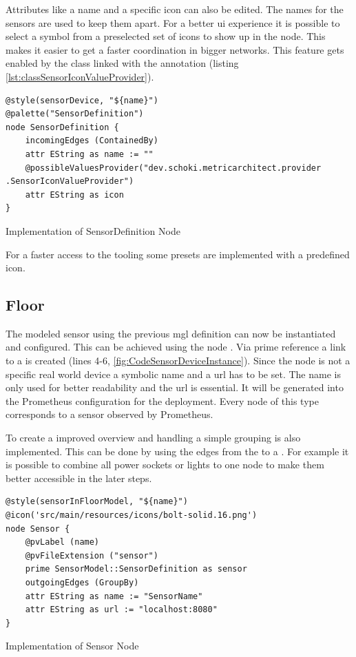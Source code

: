 Attributes like a name and a specific icon  can also be edited. The names for the sensors are used to keep them apart. For a better \gls{ui} experience it is possible to select a symbol from a preselected set of icons to show up in the node. This makes it easier to get a faster coordination in bigger networks. This feature gets enabled by the  class linked with the  annotation (listing \ref{lst:classSensorIconValueProvider}).
\begin{listing}[H]
	\begin{verbatim}
@style(sensorDevice, "${name}")
@palette("SensorDefinition")
node SensorDefinition {
	incomingEdges (ContainedBy)
	attr EString as name := ""
	@possibleValuesProvider("dev.schoki.metricarchitect.provider .SensorIconValueProvider")
	attr EString as icon
}		
	\end{verbatim}
	\caption{Implementation of SensorDefinition Node}
	\label{fig:CodeSensorDevice}
\end{listing}
For a faster access to the tooling some presets are implemented with a predefined icon.
\subsection{Floor}
The modeled sensor using the previous \gls{mgl} definition can now be instantiated and configured. This can be achieved using the node . Via prime reference a link to a  is created (lines 4-6, \ref{fig:CodeSensorDeviceInstance}). Since the  node is not a specific real world device a symbolic name and a \gls{url} has to be set. The name is only used for better readability and the \gls{url} is essential. It will be generated into the Prometheus configuration for the deployment. Every node of this type corresponds to a sensor observed by Prometheus. 

To create a improved overview and handling a simple grouping is also implemented. This can be done by using the  edges from the  to a . For example it is possible to combine all power sockets or lights to one node to make them better accessible in the later steps. 

\begin{listing}[H]
	\begin{verbatim}
@style(sensorInFloorModel, "${name}")
@icon('src/main/resources/icons/bolt-solid.16.png')
node Sensor {
	@pvLabel (name)
	@pvFileExtension ("sensor")
	prime SensorModel::SensorDefinition as sensor
	outgoingEdges (GroupBy)
	attr EString as name := "SensorName"
	attr EString as url := "localhost:8080"
}	
	\end{verbatim}
	\caption{Implementation of Sensor Node}
	\label{fig:CodeSensorDeviceInstance}
\end{listing}

